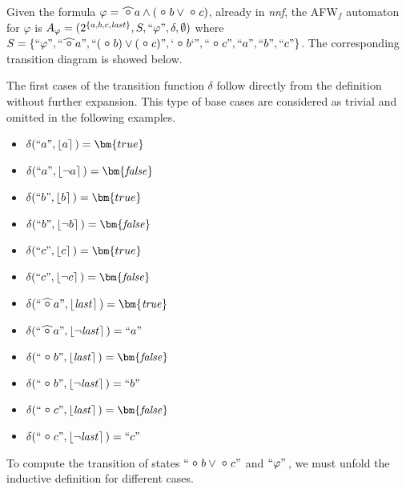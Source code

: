 \begin{example}
    Given the formula $\varphi=\wnext a \wedge (\Next b\vee\Next c)$, already in \textit{nnf}, the AFW$_f$ automaton for $\varphi$ is $A_\varphi =(2^{\{a,b,c,\mathit{last}\}},S,``\varphi",\delta,\emptyset)$ where $S=\{``\varphi",``\wnext a",``(\Next b)\vee(\Next c)",`\Next b`",``\Next c",``a",``b",``c"\}$. The corresponding transition diagram is showed below. 

    \vspace{5px}
    

    The first cases of the transition function $\delta$ follow directly from the definition without further expansion. This type of base cases are considered as trivial and omitted in the following examples.

    \begin{multicols}{2}
        \small
        \begin{itemize}
            \item $\delta(``a",\interp{a })=\bm{true}$
            \item $\delta(``a",\interp{\neg a })=\bm{\mathit{false}}$
            \item $\delta(``b",\interp{b })=\bm{true}$
            \item $\delta(``b",\interp{\neg b })=\bm{\mathit{false}}$
            \item $\delta(``c",\interp{c })=\bm{true}$
            \item $\delta(``c",\interp{\neg c })=\bm{\mathit{false}}$
            \item $\delta(``\wnext a",\interp{\last })=\bm{\mathit{true}}$
            \item $\delta(``\wnext a",\interp{\neg \last })=``a"$
            \item $\delta(``\Next b",\interp{\last })=\bm{\mathit{false}}$
            \item $\delta(``\Next b",\interp{\neg \last })=``b"$
            \item $\delta(``\Next c",\interp{\last })=\bm{\mathit{false}}$
            \item $\delta(``\Next c",\interp{\neg \last })=``c"$
        \end{itemize}
    \end{multicols}

    To compute the transition of states $``\Next b \vee \Next c"$ and $``\varphi"\,$, we must unfold the inductive definition for different cases.



\end{example}
